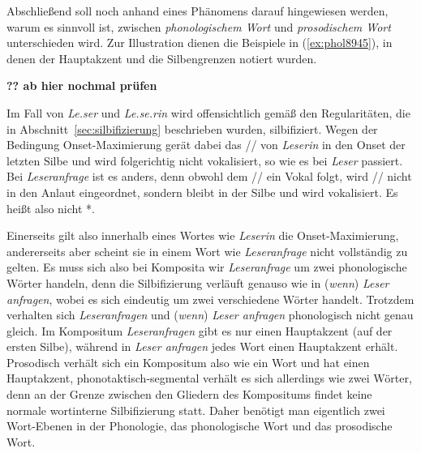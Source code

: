 \label{sec:prosphonwort}

Abschließend soll noch anhand eines Phänomens darauf hingewiesen werden, warum es sinnvoll ist, zwischen \textit{phonologischem Wort} und \textit{prosodischem Wort} unterschieden wird.
Zur Illustration dienen die Beispiele in (\ref{ex:phol8945}), in denen der Hauptakzent und die Silbengrenzen notiert wurden.

\begin{exe}
  \ex\label{ex:phol8945}
  \begin{xlist}
  \end{xlist}
\end{exe}

\textbf{?? ab hier nochmal prüfen}

Im Fall von \textit{Le.ser} und \textit{Le.se.rin} wird offensichtlich gemäß den Regularitäten, die in Abschnitt~\ref{sec:silbifizierung} beschrieben wurden, silbifiziert.
Wegen der Bedingung Onset-Maximierung gerät dabei das // von \textit{Leserin} in den Onset der letzten Silbe und wird folgerichtig nicht vokalisiert, so wie es bei \textit{Leser} passiert.
Bei \textit{Leseranfrage} ist es anders, denn obwohl dem // ein Vokal folgt, wird // nicht in den Anlaut eingeordnet, sondern bleibt in der Silbe \textipa{[z5]} und wird vokalisiert.
Es heißt also nicht *.

Einerseits gilt also innerhalb eines Wortes wie \textit{Leserin} die Onset-Maximierung, andererseits aber scheint sie in einem Wort wie \textit{Leseranfrage} nicht vollständig zu gelten.
Es muss sich also bei Komposita wir \textit{Leseranfrage} um zwei phonologische Wörter handeln, denn die Silbifizierung verläuft genauso wie in (\textit{wenn}) \textit{Leser anfragen}, wobei es sich eindeutig um zwei verschiedene Wörter handelt.
Trotzdem verhalten sich \textit{Leseranfragen} und (\textit{wenn}) \textit{Leser anfragen} phonologisch nicht genau gleich.
Im Kompositum \textit{Leseranfragen} gibt es nur einen Hauptakzent (auf der ersten Silbe), während in \textit{Leser anfragen} jedes Wort einen Hauptakzent erhält.
Prosodisch verhält sich ein Kompositum also wie ein Wort und hat einen Hauptakzent, phonotaktisch-segmental verhält es sich allerdings wie zwei Wörter, denn an der Grenze zwischen den Gliedern des Kompositums findet keine normale wortinterne Silbifizierung statt.
Daher benötigt man eigentlich zwei Wort-Ebenen in der Phonologie, das phonologische Wort und das prosodische Wort.

